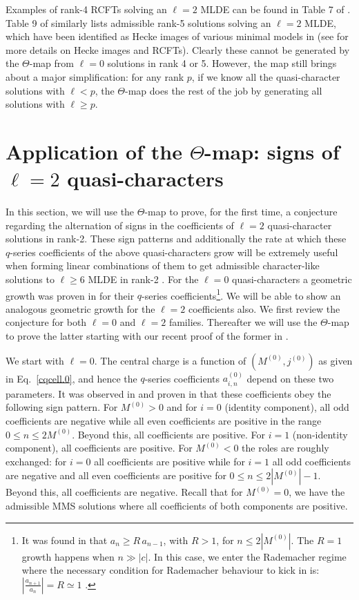 \documentclass[11pt]{article}
\begin{document}
Examples of rank-4 RCFTs solving an $\ell=2$ MLDE can be found in Table 7 of \cite{Govindarajan:2026cgv}. Table 9 of \cite{Govindarajan:2026cgv} similarly lists admissible rank-5 solutions solving an $\ell=2$ MLDE, which have been identified as Hecke images of various minimal models in \cite{Duan:2022ltz} (see \cite{Harvey:2018rdc} for more details on Hecke images and RCFTs). Clearly these cannot be generated by the $\Theta$-map from $\ell=0$ solutions in rank 4 or 5. However, the map still brings about a major simplification: for any rank $p$, if we know all the quasi-character solutions with $\ell<p$, the $\Theta$-map does the rest of the job by generating all solutions with $\ell\ge p$.

\section{Application of the $\Theta$-map: signs of $\ell=2$ quasi-characters}\label{sec:l2-signs-theta}

In this section, we will use the $\Theta$-map to prove, for the first time, a conjecture \cite{Chandra:2018pjq, Das:2025gto} regarding the alternation of signs in the coefficients of $\ell=2$ quasi-character solutions in rank-2. These sign patterns and additionally the rate at which these $q$-series coefficients of the above quasi-characters grow will be extremely useful when forming linear combinations of them to get admissible character-like solutions to $\ell\geq 6$ MLDE in rank-2 \cite{Chandra:2018pjq, Das:2025gto}. For the $\ell=0$ quasi-characters a geometric growth was proven in \cite{Das:2025gto} for their $q$-series coefficients\footnote{It was found in \cite{Das:2025gto} that $a_n\ge R\, a_{n-1}$, with $R>1$, for $n\leq 2|M^{(0)}|$. The $R=1$ growth happens when $n\gg |c|$. In this case, we enter the Rademacher regime where the necessary condition for Rademacher behaviour to kick in is: $\left|\frac{a_{n+1}}{a_n}\right|=R\simeq 1$ \cite{Das:2025gto, Chandra:2018pjq}.}. We will be able to show an analogous geometric growth for the $\ell=2$ coefficients also. We first review the conjecture for both $\ell=0$ and $\ell=2$ families. Thereafter we will use the $\Theta$-map to prove the latter starting with our recent proof of the former in \cite{Das:2025gto}.

We start with $\ell=0$. The central charge is a function of $(M^{(0)},j^{(0)})$ as given in Eq.~\eqref{cqcell.0}, and hence the $q$-series coefficients $a_{i,n}^{(0)}$ depend on these two parameters. It was observed in \cite{Chandra:2018pjq} and proven in \cite{Das:2025gto} that these coefficients obey the following sign pattern. For $M^{(0)}>0$ and for $i=0$ (identity component), all odd coefficients are negative while all even coefficients are positive in the range $0\leq n\leq 2M^{(0)}$. Beyond this, all coefficients are positive. For $i=1$ (non-identity component), all coefficients are positive. For $M^{(0)}<0$ the roles are roughly exchanged: for $i=0$ all coefficients are positive while for $i=1$ all odd coefficients are negative and all even coefficients are positive for $0\leq n\leq 2|M^{(0)}|-1$. Beyond this, all coefficients are negative. Recall that for $M^{(0)}=0$, we have the admissible MMS solutions where all coefficients of both components are positive.
\end{document}
